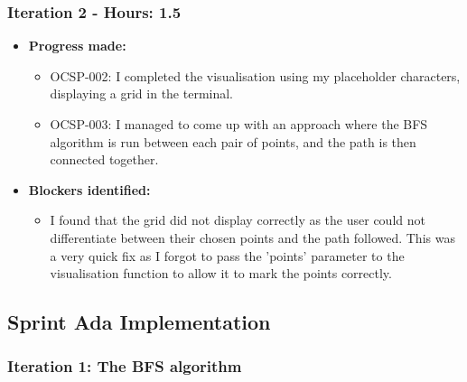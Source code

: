 \subsubsection{Iteration 2 - Hours: 1.5}
\begin{itemize}
    \item \textbf{Progress made:}
    \begin{itemize}
        \item OCSP-002: I completed the visualisation using my placeholder characters, displaying a grid in the terminal.
        \item OCSP-003: I managed to come up with an approach where the BFS algorithm is run between each pair of points, and the path is then connected together.
    \end{itemize}
    \item \textbf{Blockers identified:}
    \begin{itemize}
        \item I found that the grid did not display correctly as the user could not differentiate between their chosen points and the path followed. This was a very quick fix as I forgot to pass the 'points' parameter to the visualisation function to allow it to mark the points correctly.

    \end{itemize}
\end{itemize}


\clearpage
\subsection{Sprint Ada Implementation}

\subsubsection{Iteration 1: The BFS algorithm}

